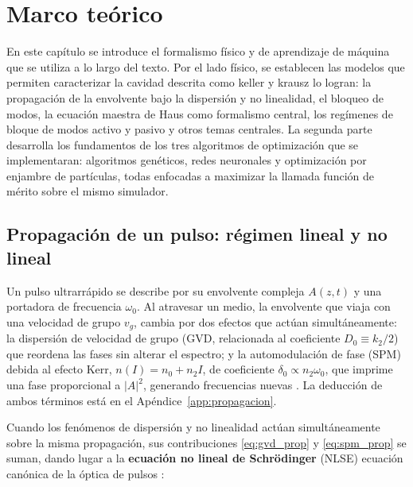 \chapter{Marco teórico}
\label{ch:Theoretical background}
\chapterminitoc

En este capítulo se introduce el formalismo físico y de aprendizaje de máquina que se utiliza a lo largo del texto. Por el lado físico, se establecen las modelos que permiten caracterizar la cavidad descrita como keller y krausz lo logran: la propagación de la envolvente bajo la dispersión y no linealidad, el bloqueo de modos, la ecuación maestra de Haus como formalismo central, los regímenes de bloque de modos activo y pasivo y otros temas centrales. La segunda parte desarrolla los fundamentos de los tres algoritmos de optimización que se implementaran: algoritmos genéticos, redes neuronales y optimización por enjambre de partículas, todas enfocadas a maximizar la llamada función de mérito sobre el mismo simulador.


\section{Propagación de un pulso: régimen lineal y no lineal}
\label{sec:propagacion}


Un pulso ultrarrápido se describe por su envolvente compleja $A(z,t)$ y una portadora de frecuencia $\omega_0$. Al atravesar un medio, la envolvente que viaja con una velocidad de grupo $v_g$, cambia por dos efectos que actúan simultáneamente: la dispersión de velocidad de grupo (GVD, relacionada al coeficiente $D_0\equiv k_2/2$) que reordena las fases sin alterar el espectro; y la automodulación de fase (SPM) debida al efecto Kerr, $n(I)=n_0+n_2I$, de coeficiente $\delta_0\propto n_2\omega_0$, que imprime una fase proporcional a $|A|^2$, generando frecuencias nuevas \cite[secs.~4.1 y 4.3]{Keller2022}. La deducción de ambos términos está en el Apéndice~\ref{app:propagacion}.

Cuando los fenómenos de dispersión y no linealidad actúan simultáneamente sobre la misma propagación, sus contribuciones \eqref{eq:gvd_prop} y \eqref{eq:spm_prop} se suman, dando lugar a la \textbf{ecuación no lineal de Schrödinger} (NLSE) ecuación
canónica de la óptica de pulsos \cite[sec.~4.3]{Keller2022}:

